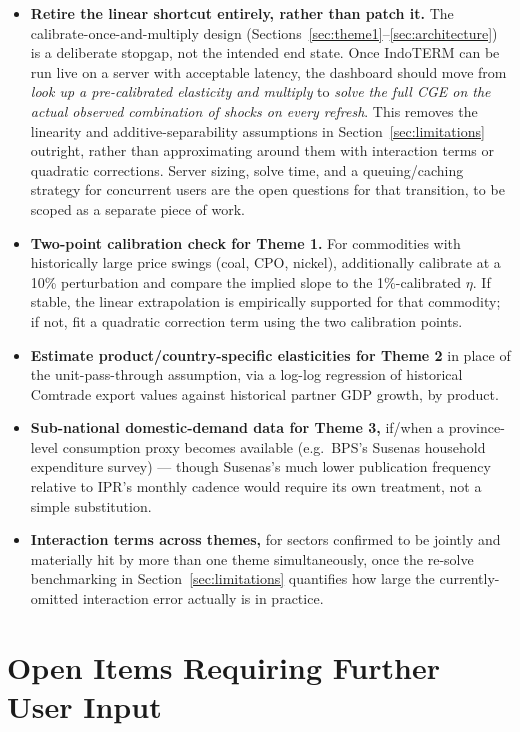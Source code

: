 \documentclass[11pt]{article}
\begin{document}
\begin{itemize}
  \item \textbf{Retire the linear shortcut entirely, rather than patch it.}
  The calibrate-once-and-multiply design (Sections~\ref{sec:theme1}--\ref{sec:architecture})
  is a deliberate stopgap, not the intended end state. Once IndoTERM can be
  run live on a server with acceptable latency, the dashboard should move
  from \emph{look up a pre-calibrated elasticity and multiply} to
  \emph{solve the full CGE on the actual observed combination of shocks on
  every refresh}. This removes the linearity and additive-separability
  assumptions in Section~\ref{sec:limitations} outright, rather than
  approximating around them with interaction terms or quadratic
  corrections. Server sizing, solve time, and a queuing/caching strategy for
  concurrent users are the open questions for that transition, to be scoped
  as a separate piece of work.
  \item \textbf{Two-point calibration check for Theme 1.} For commodities
  with historically large price swings (coal, CPO, nickel), additionally
  calibrate at a 10\% perturbation and compare the implied slope to the
  1\%-calibrated $\eta$. If stable, the linear extrapolation is empirically
  supported for that commodity; if not, fit a quadratic correction term
  using the two calibration points.
  \item \textbf{Estimate product/country-specific elasticities for Theme 2}
  in place of the unit-pass-through assumption, via a log-log regression of
  historical Comtrade export values against historical partner GDP growth,
  by product.
  \item \textbf{Sub-national domestic-demand data for Theme 3,} if/when a
  province-level consumption proxy becomes available (e.g.\ BPS's Susenas
  household expenditure survey) --- though Susenas's much lower publication
  frequency relative to IPR's monthly cadence would require its own
  treatment, not a simple substitution.
  \item \textbf{Interaction terms across themes,} for sectors confirmed to
  be jointly and materially hit by more than one theme simultaneously, once
  the re-solve benchmarking in Section~\ref{sec:limitations} quantifies how
  large the currently-omitted interaction error actually is in practice.
\end{itemize}

\section{Open Items Requiring Further User Input}
\label{sec:open-items}
\end{document}
